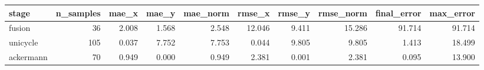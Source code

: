 \begin{tabular}{lrrrrrrrrr}
\hline
stage & n\_samples & mae\_x & mae\_y & mae\_norm & rmse\_x & rmse\_y & rmse\_norm & final\_error & max\_error \\
\hline
fusion & 36 & 2.008 & 1.568 & 2.548 & 12.046 & 9.411 & 15.286 & 91.714 & 91.714 \\
unicycle & 105 & 0.037 & 7.752 & 7.753 & 0.044 & 9.805 & 9.805 & 1.413 & 18.499 \\
ackermann & 70 & 0.949 & 0.000 & 0.949 & 2.381 & 0.001 & 2.381 & 0.095 & 13.900 \\
\hline
\end{tabular}